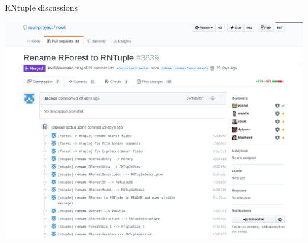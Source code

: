 \documentclass[aspectratio=169]{beamer}
\begin{document}
\begin{frame}{ RNtuple discussions}
\vspace{-0.04 cm}

\begin{center}
\includegraphics[width=0.85\linewidth]{rforest-rntuple.png}
\end{center}
\end{frame}
\end{document}
